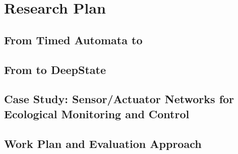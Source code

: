 \section{Research Plan}

\subsection{From Timed Automata to \framac}
\label{sec:ta2framac}


\subsection{From \framac to DeepState}
\label{sec:framac2deepstate}



\subsection{Case Study: Sensor/Actuator Networks for Ecological Monitoring and Control}
\label{sec:case-study}


\subsection{Work Plan and Evaluation Approach}
\label{sec:workplan}

